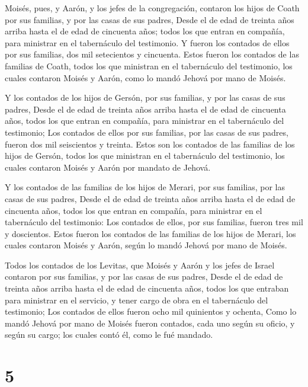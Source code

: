  Moisés, pues, y Aarón, y los jefes de la congregación,
contaron los hijos de Coath por sus familias, y por las casas de sus
padres,  Desde el de edad de treinta años arriba hasta el
de edad de cincuenta años; todos los que entran en compañía, para
ministrar en el tabernáculo del testimonio.  Y fueron los
contados de ellos por sus familias, dos mil setecientos y cincuenta.
 Estos fueron los contados de las familias de Coath, todos
los que ministran en el tabernáculo del testimonio, los cuales contaron
Moisés y Aarón, como lo mandó Jehová por mano de Moisés.

 Y los contados de los hijos de Gersón, por sus familias, y
por las casas de sus padres,  Desde el de edad de treinta
años arriba hasta el de edad de cincuenta años, todos los que entran en
compañía, para ministrar en el tabernáculo del testimonio; 
Los contados de ellos por sus familias, por las casas de sus padres,
fueron dos mil seiscientos y treinta.  Estos son los
contados de las familias de los hijos de Gersón, todos los que ministran
en el tabernáculo del testimonio, los cuales contaron Moisés y Aarón por
mandato de Jehová.

 Y los contados de las familias de los hijos de Merari, por
sus familias, por las casas de sus padres,  Desde el de
edad de treinta años arriba hasta el de edad de cincuenta años, todos
los que entran en compañía, para ministrar en el tabernáculo del
testimonio:  Los contados de ellos, por sus familias,
fueron tres mil y doscientos.  Estos fueron los contados de
las familias de los hijos de Merari, los cuales contaron Moisés y Aarón,
según lo mandó Jehová por mano de Moisés.

 Todos los contados de los Levitas, que Moisés y Aarón y
los jefes de Israel contaron por sus familias, y por las casas de sus
padres,  Desde el de edad de treinta años arriba hasta el
de edad de cincuenta años, todos los que entraban para ministrar en el
servicio, y tener cargo de obra en el tabernáculo del testimonio;
 Los contados de ellos fueron ocho mil quinientos y
ochenta,  Como lo mandó Jehová por mano de Moisés fueron
contados, cada uno según su oficio, y según su cargo; los cuales contó
él, como le fué mandado.

\hypertarget{section-4}{%
\section{5}\label{section-4}}

